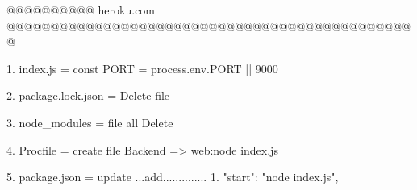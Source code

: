 @@@@@@@@@@ heroku.com @@@@@@@@@@@@@@@@@@@@@@@@@@@@@@@@@@@@@@@@@@@@@@@

1. index.js = const PORT = process.env.PORT || 9000

2. package.lock.json =  Delete file 

3. node_modules  = file all Delete 

4. Procfile = create file Backend
   => web:node index.js

5. package.json = update ...add..............
  1. "start": "node index.js",
